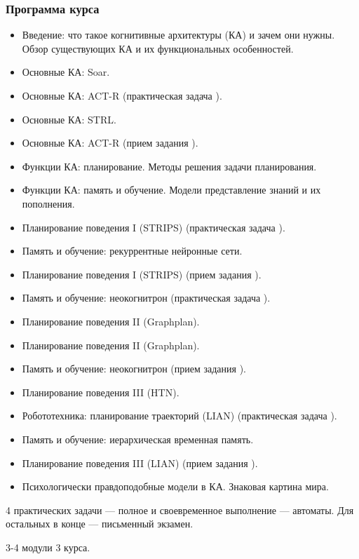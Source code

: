 \documentclass[default]{beamer}
\begin{document}
	\begin{frame}
		\frametitle{Программа курса}
		
		\begin{itemize}
			\tiny 
			\item<pro@1-> Введение: что такое когнитивные архитектуры (КА) и зачем они нужны. Обзор существующих КА и их функциональных особенностей.
			\item<pro@1-> Основные КА: Soar.
			\item<pro@1-> Основные КА: ACT-R (практическая задача ).
			\item<con@1-> Основные КА: STRL.
			\item<pro@1-> Основные КА: ACT-R (прием задания ).
			\item<con@1-> Функции КА: планирование. Методы решения задачи планирования.
			\item<pro@1-> Функции КА: память и обучение. Модели представление знаний и их пополнения.
			\item<con@1-> Планирование поведения I (STRIPS) (практическая задача ).
			\item<pro@1-> Память и обучение: рекуррентные нейронные сети.
			\item<con@1-> Планирование поведения I (STRIPS) (прием задания ).
			\item<pro@1-> Память и обучение: неокогнитрон (практическая задача ).
			\item<con@1-> Планирование поведения II (Graphplan).
			\item<con@1-> Планирование поведения II (Graphplan).
			\item<pro@1-> Память и обучение: неокогнитрон (прием задания ).
			\item<con@1-> Планирование поведения III (HTN).
			\item<con@1-> Робототехника: планирование траекторий (LIAN) (практическая задача ).
			\item<pro@1-> Память и обучение: иерархическая временная память.
			\item<con@1-> Планирование поведения III (LIAN) (прием задания ).
			\item<pro@1-> Психологически правдоподобные модели в КА. Знаковая картина мира.
		\end{itemize}
		
		4 практических задачи --- полное и своевременное выполнение --- автоматы. Для остальных в конце --- письменный экзамен.
		
		3-4 модули 3 курса.
	\end{frame}
\end{document}
